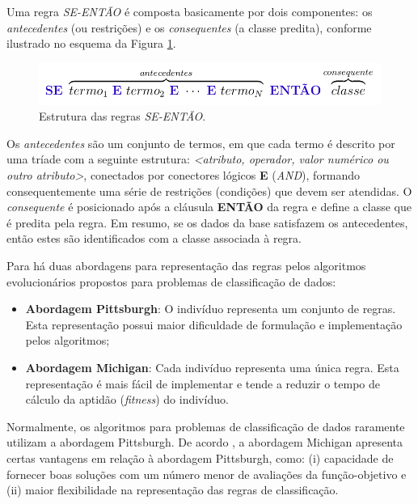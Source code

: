 \documentclass[
	12pt,				%
	openany,			%
	oneside,	
	a4paper,			%
	brazil,				%
	]{unimontes-ppgmsc-abntex2}
\begin{document}
Uma regra {\em SE-ENTÃO} é composta basicamente por dois componentes: os {\em antecedentes} (ou restrições) e os {\em consequentes} (a classe predita), conforme ilustrado no esquema da Figura \ref{fig:se-entao}.

\begin{figure}[ht]
\centering
\includegraphics[scale=.5]{img/se-entao}
\caption{Estrutura das regras {\em SE-ENTÃO}.}
\label{fig:se-entao}
\end{figure}

Os {\em antecedentes} são um conjunto de termos, em que cada termo é descrito por uma tríade com a seguinte estrutura: \textit{<atributo, operador, valor numérico ou outro atributo>}, conectados por conectores lógicos \textbf{E} ({\em AND}), formando consequentemente uma série de restrições (condições) que devem ser atendidas. O {\em consequente} é posicionado após a cláusula \textbf{ENTÃO} da regra e define a classe que é predita pela regra. Em resumo, se os dados da base satisfazem os antecedentes, então estes são identificados com a classe associada à regra.

Para  há duas abordagens para representação das regras pelos algoritmos evolucionários propostos para problemas de classificação de dados:
 
\begin{itemize}
\item \textbf{Abordagem Pittsburgh}: O indivíduo representa um conjunto de regras. Esta representação possui maior dificuldade de formulação e implementação pelos algoritmos;
\item \textbf{Abordagem Michigan}: Cada indivíduo representa uma única regra. Esta representação é mais fácil de implementar e tende a reduzir o tempo de cálculo da aptidão ({\em fitness}) do indivíduo.
\end{itemize}

Normalmente, os algoritmos para problemas de classificação de dados raramente utilizam a abordagem Pittsburgh. De acordo , a abordagem Michigan apresenta certas vantagens em relação à abordagem Pittsburgh, como: (i) capacidade de fornecer boas soluções com um número menor de avaliações da função-objetivo e (ii) maior flexibilidade na representação das regras de classificação.
\end{document}
